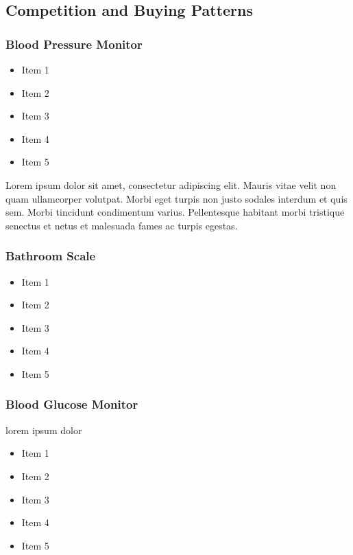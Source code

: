 \documentclass[11pt,a4paper,titlepage]{article}
\begin{document}
\subsection{Competition and Buying Patterns}

\subsubsection{Blood Pressure Monitor}
\begin{itemize}
\item Item 1
\item Item 2
\item Item 3
\item Item 4
\item Item 5
\end{itemize}
Lorem ipsum dolor sit amet, consectetur adipiscing elit. Mauris vitae velit 
non quam ullamcorper volutpat. Morbi eget turpis non justo sodales interdum 
et quis sem. Morbi tincidunt condimentum varius. Pellentesque habitant morbi 
tristique senectus et netus et malesuada fames ac turpis egestas.\newline
\subsubsection{Bathroom Scale}
\begin{itemize}
\item Item 1
\item Item 2
\item Item 3
\item Item 4
\item Item 5
\end{itemize}
\subsubsection{Blood Glucose Monitor}
lorem ipsum dolor
\begin{itemize}
\item Item 1
\item Item 2
\item Item 3
\item Item 4
\item Item 5
\end{itemize}
\end{document}
